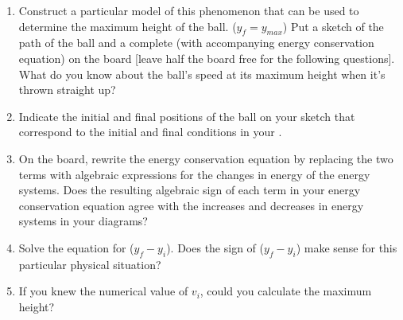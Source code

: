 \begin{enumerate}
	\item Construct a particular model of this phenomenon that can be used to determine the maximum height of the ball. ($y_f = y_{max}$) Put a sketch of the path of the ball and a complete \EnergyDiagram{} (with accompanying energy conservation equation) on the board [leave half the board free for the following questions]. What do you know about the ball's speed at its maximum height when it's thrown straight up?
	
	\item Indicate the initial and final positions of the ball on your sketch that correspond to the initial and final conditions in your \EnergyDiagram{}.
	
	\item On the board, rewrite the energy conservation equation by replacing the two terms with algebraic expressions for the changes in energy of the energy systems. Does the resulting algebraic sign of each term in your energy conservation equation agree with the increases and decreases in energy systems in your diagrams?
	
	\item Solve the equation for ($y_f - y_i$). Does the sign of ($y_f - y_i$) make sense for this particular physical situation?
	\label{act2.2.1b4}
	
	\item If you knew the numerical value of $v_i$, could you calculate the maximum height?
\end{enumerate}

\WCD